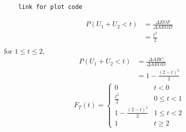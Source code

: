 \documentclass[journal,12pt,twocolumn]{IEEEtran}
\renewcommand\thesection{\arabic{section}}
\theoremstyle{remark}
\numberwithin{equation}{section}
\begin{document}
\begin{enumerate}[label=\thesection.\arabic*
,ref=\thesection.\theenumi]
\begin{lstlisting}
	link for plot code 
\end{lstlisting}
\begin{align}
	P(U_1+U_2 <t) &= \frac{\Delta EOF}{\Delta AEOD}\\
	 &= \frac{t^2}{2} \\
\end{align}
for $1 \leq t \leq 2$,
\begin{align}
	P(U_1+U_2 <t) &= \frac{\Delta ABC}{\Delta AEOD}\\
	 &= 1 - \frac{(2-t)^2}{2} 
\end{align}
\begin{align}
	 F_T(t) = 
	 \begin{cases}
		0 & t<0 \\
		\frac{t^2}{2} & 0 \leq t < 1 \\
		1 - \frac{(2-t)^2}{2} & 1 \leq t < 2 \\
		1 & t \geq 2
	 \end{cases}
\end{align}


\end{enumerate}
\end{document}
